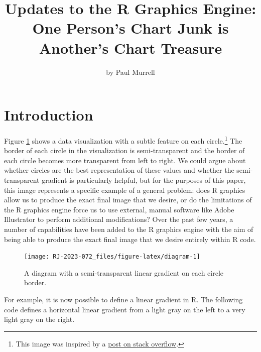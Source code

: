 \title{Updates to the R Graphics Engine: One Person's Chart Junk is Another's Chart Treasure}


\author{by Paul Murrell}

\maketitle


\hypertarget{introduction}{%
\section{Introduction}\label{introduction}}

Figure \ref{fig:diagram} shows a data visualization
with a subtle feature on each
circle.\footnote{This image was inspired by a \href{https://stackoverflow.com/questions/69755844/is-it-possible-to-draw-the-following-diagram-in-r}{post on stack overflow}.}
The border of each circle in the visualization is
semi-transparent and the border of each circle becomes
more transparent from left to right. We could argue about whether
circles are the best representation of these values and whether the
semi-transparent gradient is particularly helpful, but for the
purposes of this paper, this image
represents a specific example of a general problem: does R graphics
allow us to produce the exact final image that we desire, or
do the limitations of the R graphics engine
force us to use external, manual software
like Adobe Illustrator to perform additional
modifications? Over the past few years, a number of capabilities
have been added to the R graphics engine with the aim of being
able to produce the exact final image that we desire entirely within
R code.

\begin{figure}[h]
\texttt{[image: RJ-2023-072\_files/figure-latex/diagram-1]} \caption{A diagram with a semi-transparent linear gradient on each circle border.}\label{fig:diagram}
\end{figure}

For example, it is now possible to define a linear gradient in R.
The following code defines a horizontal linear gradient from a light gray
on the left
to a very light gray on the right.

